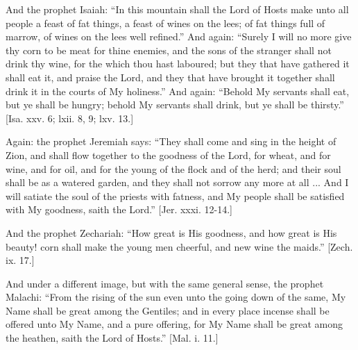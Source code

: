 And the prophet Isaiah: ``In this mountain shall the Lord of
Hosts make unto all people a feast of fat things, a feast of wines on
the lees; of fat things full of marrow, of wines on the lees well
refined.'' And again: ``Surely I will no more give thy corn to
be meat for thine enemies, and the sons of the stranger shall not
drink thy wine, for the which thou hast laboured; but they that have
gathered it shall eat it, and praise the Lord, and they that have
brought it together shall drink it in the courts of My holiness.''
And again: ``Behold My servants shall eat, but ye shall be hungry;
behold My servants shall drink, but ye shall be thirsty.'' [Isa.
xxv. 6; lxii. 8, 9; lxv. 13.]

Again: the prophet Jeremiah says: ``They shall come and sing in
the height of Zion, and shall flow together to the goodness of the
Lord, for wheat, and for wine, and for oil, and for the young of the
flock and of the herd; and their soul shall be as a watered garden,
and they shall not sorrow any more at all ... And I will satiate the
soul of the priests with fatness, and My people shall be satisfied
with My goodness, saith the Lord.'' [Jer. xxxi. 12-14.]

And the prophet Zechariah: ``How great is His goodness, and how
great is His beauty! corn shall make the young men cheerful, and new
wine the maids.'' [Zech. ix. 17.]

And under a different image, but with the same general sense, the
prophet Malachi: ``From the rising of the sun even unto the going
down of the same, My Name shall be great among the Gentiles; and in
every place incense shall be offered unto My Name, and a pure
offering, for My Name shall be great among the heathen, saith the Lord
of Hosts.'' [Mal. i. 11.]

